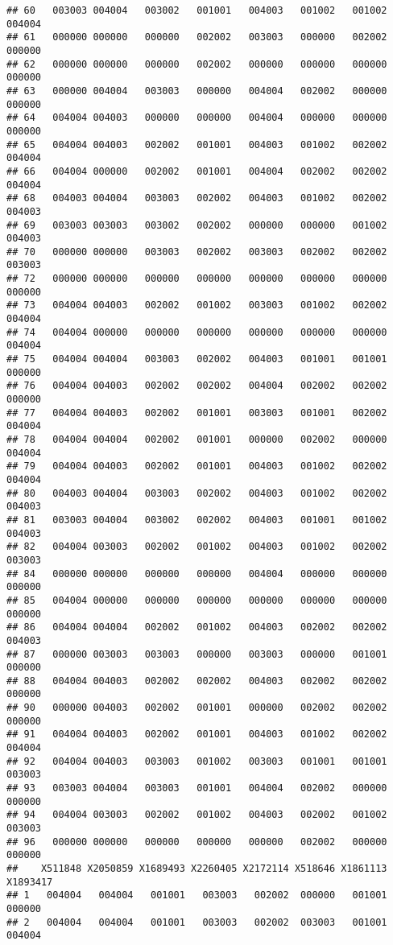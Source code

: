 \documentclass[
]{article}
\begin{document}
\begin{verbatim}
## 60   003003 004004   003002   001001   004003   001002   001002   004004
## 61   000000 000000   000000   002002   003003   000000   002002   000000
## 62   000000 000000   000000   002002   000000   000000   000000   000000
## 63   000000 004004   003003   000000   004004   002002   000000   000000
## 64   004004 004003   000000   000000   004004   000000   000000   000000
## 65   004004 004003   002002   001001   004003   001002   002002   004004
## 66   004004 000000   002002   001001   004004   002002   002002   004004
## 68   004003 004004   003003   002002   004003   001002   002002   004003
## 69   003003 003003   003002   002002   000000   000000   001002   004003
## 70   000000 000000   003003   002002   003003   002002   002002   003003
## 72   000000 000000   000000   000000   000000   000000   000000   000000
## 73   004004 004003   002002   001002   003003   001002   002002   004004
## 74   004004 000000   000000   000000   000000   000000   000000   004004
## 75   004004 004004   003003   002002   004003   001001   001001   000000
## 76   004004 004003   002002   002002   004004   002002   002002   000000
## 77   004004 004003   002002   001001   003003   001001   002002   004004
## 78   004004 004004   002002   001001   000000   002002   000000   004004
## 79   004004 004003   002002   001001   004003   001002   002002   004004
## 80   004003 004004   003003   002002   004003   001002   002002   004003
## 81   003003 004004   003002   002002   004003   001001   001002   004003
## 82   004004 003003   002002   001002   004003   001002   002002   003003
## 84   000000 000000   000000   000000   004004   000000   000000   000000
## 85   004004 000000   000000   000000   000000   000000   000000   000000
## 86   004004 004004   002002   001002   004003   002002   002002   004003
## 87   000000 003003   003003   000000   003003   000000   001001   000000
## 88   004004 004003   002002   002002   004003   002002   002002   000000
## 90   000000 004003   002002   001001   000000   002002   002002   000000
## 91   004004 004003   002002   001001   004003   001002   002002   004004
## 92   004004 004003   003003   001002   003003   001001   001001   003003
## 93   003003 004004   003003   001001   004004   002002   000000   000000
## 94   004004 003003   002002   001002   004003   002002   001002   003003
## 96   000000 000000   000000   000000   000000   002002   000000   000000
##    X511848 X2050859 X1689493 X2260405 X2172114 X518646 X1861113 X1893417
## 1   004004   004004   001001   003003   002002  000000   001001   000000
## 2   004004   004004   001001   003003   002002  003003   001001   004004

\end{verbatim}
\end{document}
